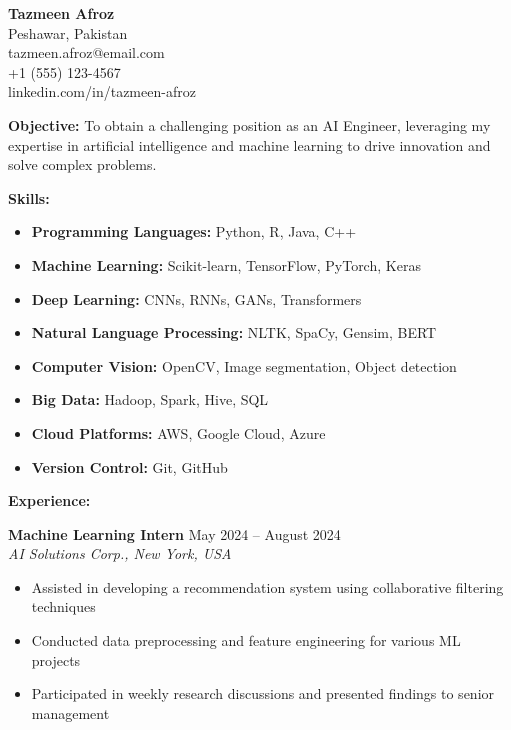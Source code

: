 \documentclass[a4paper,12pt]{article}
\begin{document}
\vspace*{-5em}

\noindent
\begin{minipage}[t]{0.7\textwidth}
    \raggedright
    \Large   \textbf{Tazmeen Afroz} \\ %
    Peshawar, Pakistan \\
    tazmeen.afroz@email.com \\
    +1 (555) 123-4567 \\
    linkedin.com/in/tazmeen-afroz
\end{minipage}%
\hfill

\vspace{1em}
\noindent
\textbf{Objective:} To obtain a challenging position as an AI Engineer, leveraging my expertise in artificial intelligence and machine learning to drive innovation and solve complex problems.

\vspace{1em}
\noindent
\textbf{Skills:}
\begin{itemize}[leftmargin=*]
    \item \textbf{Programming Languages:} Python, R, Java, C++
    \item \textbf{Machine Learning:} Scikit-learn, TensorFlow, PyTorch, Keras
    \item \textbf{Deep Learning:} CNNs, RNNs, GANs, Transformers
    \item \textbf{Natural Language Processing:} NLTK, SpaCy, Gensim, BERT
    \item \textbf{Computer Vision:} OpenCV, Image segmentation, Object detection
    \item \textbf{Big Data:} Hadoop, Spark, Hive, SQL
    \item \textbf{Cloud Platforms:} AWS, Google Cloud, Azure
    \item \textbf{Version Control:} Git, GitHub
\end{itemize}

\textbf{Experience:}

\textbf{Machine Learning Intern} \hfill May 2024 -- August 2024 \\
\textit{AI Solutions Corp., New York, USA}
\begin{itemize}[leftmargin=*]
    \item Assisted in developing a recommendation system using collaborative filtering techniques
    \item Conducted data preprocessing and feature engineering for various ML projects
    \item Participated in weekly research discussions and presented findings to senior management
\end{itemize}
\end{document}
